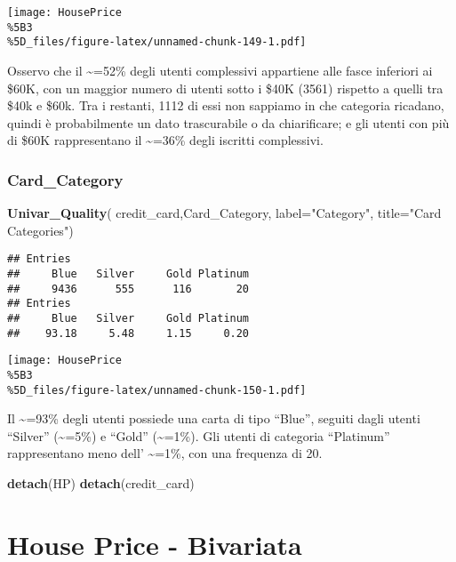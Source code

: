 \documentclass[
]{article}
\newenvironment{Shaded}{\begin{snugshade}}{\end{snugshade}}
\newcommand{\AttributeTok}[1]{\textcolor[rgb]{0.13,0.29,0.53}{#1}}
\newcommand{\FunctionTok}[1]{\textcolor[rgb]{0.13,0.29,0.53}{\textbf{#1}}}
\newcommand{\NormalTok}[1]{#1}
\newcommand{\StringTok}[1]{\textcolor[rgb]{0.31,0.60,0.02}{#1}}
\begin{document}
\texttt{[image: HousePrice\\\%5B3\\\%5D\_files/figure-latex/unnamed-chunk-149-1.pdf]}

Osservo che il \textasciitilde=52\% degli utenti complessivi appartiene
alle fasce inferiori ai \$60K, con un maggior numero di utenti sotto i
\$40K (3561) rispetto a quelli tra \$40k e \$60k. Tra i restanti, 1112
di essi non sappiamo in che categoria ricadano, quindi è probabilmente
un dato trascurabile o da chiarificare; e gli utenti con più di \$60K
rappresentano il \textasciitilde=36\% degli iscritti complessivi.

\subsubsection{Card\_Category}\label{card_category}

\begin{Shaded}
\begin{Highlighting}[]
\FunctionTok{Univar\_Quality}\NormalTok{(}
\NormalTok{  credit\_card,Card\_Category,}
  \AttributeTok{label=}\StringTok{"Category"}\NormalTok{,}
  \AttributeTok{title=}\StringTok{"Card Categories"}\NormalTok{)}
\end{Highlighting}
\end{Shaded}

\begin{verbatim}
## Entries
##     Blue   Silver     Gold Platinum 
##     9436      555      116       20 
## Entries
##     Blue   Silver     Gold Platinum 
##    93.18     5.48     1.15     0.20
\end{verbatim}

\texttt{[image: HousePrice\\\%5B3\\\%5D\_files/figure-latex/unnamed-chunk-150-1.pdf]}

Il \textasciitilde=93\% degli utenti possiede una carta di tipo
``Blue'', seguiti dagli utenti ``Silver'' (\textasciitilde=5\%) e
``Gold'' (\textasciitilde=1\%). Gli utenti di categoria ``Platinum''
rappresentano meno dell' \textasciitilde=1\%, con una frequenza di 20.

\begin{Shaded}
\begin{Highlighting}[]
\FunctionTok{detach}\NormalTok{(HP)}
\FunctionTok{detach}\NormalTok{(credit\_card)}
\end{Highlighting}
\end{Shaded}

\section{House Price - Bivariata}\label{house-price---bivariata}
\end{document}
